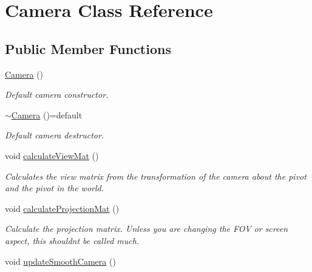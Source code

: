 \hypertarget{class_camera}{}\section{Camera Class Reference}
\label{class_camera}
\subsection*{Public Member Functions}
\begin{DoxyCompactItemize}
\item 
\hypertarget{class_camera_a01f94c3543f56ede7af49dc778f19331}{}\hyperlink{class_camera_a01f94c3543f56ede7af49dc778f19331}{Camera} ()\label{class_camera_a01f94c3543f56ede7af49dc778f19331}

\begin{DoxyCompactList}\small\item\em Default camera constructor. \end{DoxyCompactList}\item 
\hypertarget{class_camera_adcb96efefa7af58e3ee6534b15d4979b}{}\hyperlink{class_camera_adcb96efefa7af58e3ee6534b15d4979b}{$\sim$\+Camera} ()=default\label{class_camera_adcb96efefa7af58e3ee6534b15d4979b}

\begin{DoxyCompactList}\small\item\em Default camera destructor. \end{DoxyCompactList}\item 
\hypertarget{class_camera_ab6dad3dafd585946ab18b9f58d9a6b15}{}void \hyperlink{class_camera_ab6dad3dafd585946ab18b9f58d9a6b15}{calculate\+View\+Mat} ()\label{class_camera_ab6dad3dafd585946ab18b9f58d9a6b15}

\begin{DoxyCompactList}\small\item\em Calculates the view matrix from the transformation of the camera about the pivot and the pivot in the world. \end{DoxyCompactList}\item 
\hypertarget{class_camera_a73ea6a131382a08917260447a7ff2db5}{}void \hyperlink{class_camera_a73ea6a131382a08917260447a7ff2db5}{calculate\+Projection\+Mat} ()\label{class_camera_a73ea6a131382a08917260447a7ff2db5}

\begin{DoxyCompactList}\small\item\em Calculate the projection matrix. Unless you are changing the F\+O\+V or screen aspect, this shouldn\textquotesingle{}t be called much. \end{DoxyCompactList}\item 
\hypertarget{class_camera_aaeb9aa4787c11b48bca4c46b0dfb1cb1}{}void \hyperlink{class_camera_aaeb9aa4787c11b48bca4c46b0dfb1cb1}{update\+Smooth\+Camera} ()\label{class_camera_aaeb9aa4787c11b48bca4c46b0dfb1cb1}


\end{DoxyCompactItemize}
